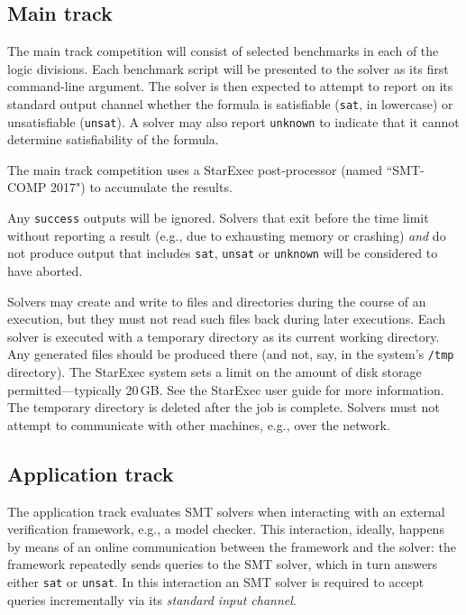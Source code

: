 \documentclass[12pt]{article}
\begin{document}
\subsection{Main track}
\label{sec:exec:main}

The main track competition will consist of selected benchmarks in each
of the logic divisions.  Each benchmark script will be presented to
the solver as its first command-line argument.  The solver is then
expected to attempt to report on its standard output channel whether
the formula is satisfiable (\texttt{sat}, in lowercase) or
unsatisfiable (\texttt{unsat}).  A solver may also report
\texttt{unknown} to indicate that it cannot determine satisfiability
of the formula.

The main track competition uses a StarExec post-processor (named
``SMT-COMP 2017") to accumulate the results.

%
Any \texttt{success} outputs will be ignored.  Solvers that exit
before the time limit without reporting a result (e.g., due to
exhausting memory or crashing) \emph{and} do not produce output that
includes \texttt{sat}, \texttt{unsat} or \texttt{unknown} will be
considered to have aborted.

%
Solvers may create and write to files and directories during the
course of an execution, but they must not read such files back during
later executions.  Each solver is executed with a temporary directory
as its current working directory.  Any generated files should be
produced there (and not, say, in the system's \texttt{/tmp}
directory).  The StarExec system sets a limit on the amount of disk
storage permitted---typically 20\,GB.  See the StarExec user guide for
more information.  The temporary directory is deleted after the job is
complete.  Solvers must not attempt to communicate with other
machines, e.g., over the network.

\subsection{Application track}

The application track evaluates SMT solvers when interacting with an
external verification framework, e.g., a model checker. This
interaction, ideally, happens by means of an online communication
between the framework and the solver: the framework repeatedly sends
queries to the SMT solver, which in turn answers either \texttt{sat}
or \texttt{unsat}.  In this interaction an SMT solver is required to
accept queries incrementally via its \emph{standard input channel}.
\end{document}
